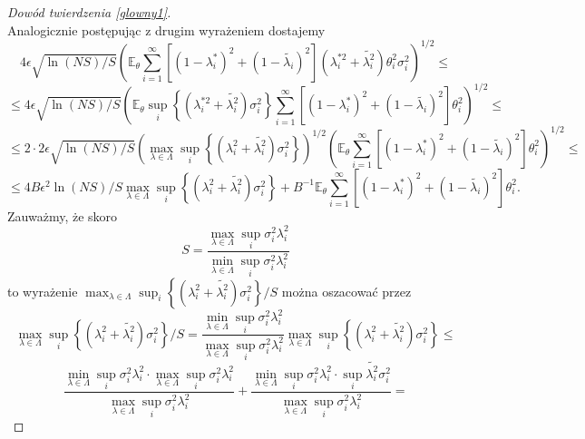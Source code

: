 \documentclass{article}
\begin{document}
\begin{proof}[Dowód twierdzenia \ref{glowny1}]
\begin{displaymath}
\end{displaymath}
Analogicznie postępując z drugim wyrażeniem dostajemy
\begin{displaymath}
4\epsilon\sqrt{\ln (NS)/S}\left(\mathbb{E}_{\theta}\sum_{i=1}^{\infty}[(1-\lambda_i^*)^2+(1-\tilde{\lambda_i})^2](\lambda_i^{*2}+\tilde{\lambda_i^2})\theta_i^2\sigma_i^2\right)^{1/2}\leq
\end{displaymath}
\begin{displaymath}
\leq 4\epsilon\sqrt{\ln (NS)/S}\left(\mathbb{E}_{\theta}\sup_i\left\{(\lambda_i^{*2}+\tilde{\lambda_i^2})\sigma_i^2\right\}\sum_{i=1}^{\infty}[(1-\lambda_i^*)^2+(1-\tilde{\lambda_i})^2]\theta_i^2\right)^{1/2}\leq
\end{displaymath}
\begin{displaymath}
\leq 2\cdot 2\epsilon\sqrt{\ln (NS)/S} \left(\max_{\lambda\in \Lambda}\sup_i\left\{(\lambda_i^{2}+\tilde{\lambda_i^2})\sigma_i^2\right\}\right)^{1/2}\left(\mathbb{E}_{\theta}\sum_{i=1}^{\infty}[(1-\lambda_i^*)^2+(1-\tilde{\lambda_i})^2]\theta_i^2\right)^{1/2}\leq
\end{displaymath}
\begin{displaymath}
\leq 4B\epsilon^2\ln (NS)/S\max_{\lambda\in \Lambda}\sup_i\left\{(\lambda_i^{2}+\tilde{\lambda_i^2})\sigma_i^2\right\}+B^{-1}\mathbb{E}_{\theta}\sum_{i=1}^{\infty}[(1-\lambda_i^*)^2+(1-\tilde{\lambda_i})^2]\theta_i^2.
\end{displaymath}
Zauważmy, że skoro
\begin{displaymath}
S=\frac{\max_{\lambda\in\Lambda}\sup_i\sigma_i^2\lambda_i^2}{\min_{\lambda\in\Lambda}\sup_i\sigma_i^2\lambda_i^2}
\end{displaymath}
to wyrażenie $\max_{\lambda\in \Lambda}\sup_i\left\{(\lambda_i^{2}+\tilde{\lambda_i^2})\sigma_i^2\right\}/S$ można oszacować przez
\begin{displaymath}
\max_{\lambda\in \Lambda}\sup_i\left\{(\lambda_i^{2}+\tilde{\lambda_i^2})\sigma_i^2\right\}/S=\frac{\min_{\lambda\in\Lambda}\sup_i\sigma_i^2\lambda_i^2}{\max_{\lambda\in\Lambda}\sup_i\sigma_i^2\lambda_i^2}\max_{\lambda\in \Lambda}\sup_i\left\{(\lambda_i^{2}+\tilde{\lambda_i^2})\sigma_i^2\right\}\leq
\end{displaymath}
\begin{displaymath}
\frac{\min_{\lambda\in\Lambda}\sup_i\sigma_i^2\lambda_i^2\cdot \max_{\lambda\in\Lambda}\sup_i\sigma_i^2\lambda_i^2}{\max_{\lambda\in\Lambda}\sup_i\sigma_i^2\lambda_i^2}+\frac{\min_{\lambda\in\Lambda}\sup_i\sigma_i^2\lambda_i^2\cdot \sup_i\tilde{\lambda_i^2}\sigma_i^2}{\max_{\lambda\in\Lambda}\sup_i\sigma_i^2\lambda_i^2}=

\end{displaymath}
\end{proof}
\end{document}
